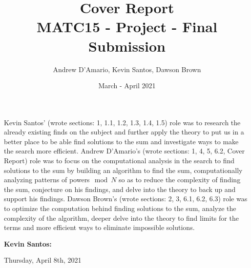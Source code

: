 \documentclass{article}
\title{Cover Report \\ \vspace{.3in} \large{MATC15 - Project - Final Submission}}
\author{Andrew D'Amario, Kevin Santos, Dawson Brown}
\date{March - April 2021}
\begin{document}
\maketitle

\begin{flushleft}



Kevin Santos' (wrote sections: 1, 1.1, 1.2, 1.3, 1.4, 1.5) role was to research the already existing finds on the subject and further apply the theory to put us in a better place to be able find solutions to the sum and investigate ways to make the search more efficient.
Andrew D'Amario's (wrote sections: 1, 4, 5, 6.2, Cover Report) role was to focus on the computational analysis in the search to find solutions to the sum by building an algorithm to find the sum, computationally analyzing patterns of powers$\mod N$ so as to reduce the complexity of finding the sum, conjecture on his findings, and delve into the theory to back up and support his findings.
Dawson Brown's (wrote sections: 2, 3, 6.1, 6.2, 6.3) role was to optimize the computation behind finding solutions to the sum, analyze the complexity of the algorithm, deeper delve into the theory to find limits for the terms and more efficient ways to eliminate impossible solutions.

\vspace{.5in}

{\bf Kevin Santos:}
\hspace{.63in}{\bf Dawson Brown:}
\hspace{.63in}{\bf Andrew D'Amario: }  


\vspace{1in}


Thursday, April 8th, 2021

\end{flushleft}
\end{document}
